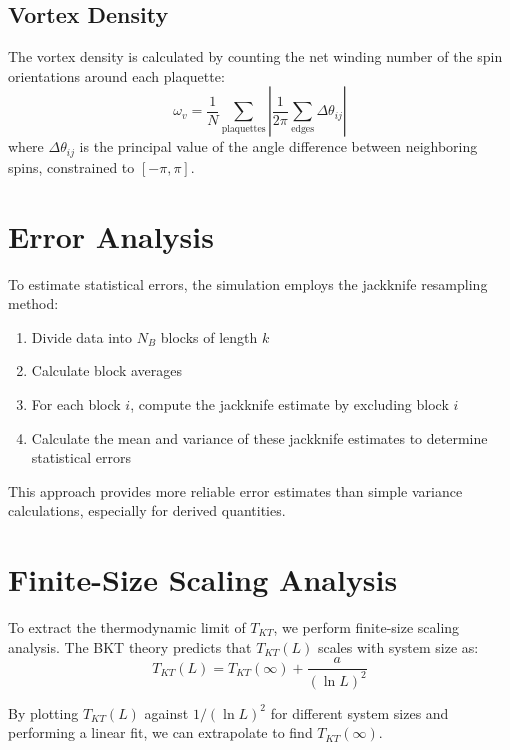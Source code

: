 \documentclass[12pt,a4paper]{article}
\begin{document}
\subsection{Vortex Density}

The vortex density is calculated by counting the net winding number of the spin orientations around each plaquette:
\begin{equation}
\omega_v = \frac{1}{N} \sum_{\text{plaquettes}} \left| \frac{1}{2\pi} \sum_{\text{edges}} \Delta\theta_{ij} \right|
\end{equation}
where $\Delta\theta_{ij}$ is the principal value of the angle difference between neighboring spins, constrained to $[-\pi, \pi]$.

\section{Error Analysis}

To estimate statistical errors, the simulation employs the jackknife resampling method:
\begin{enumerate}
    \item Divide data into $N_B$ blocks of length $k$
    \item Calculate block averages
    \item For each block $i$, compute the jackknife estimate by excluding block $i$
    \item Calculate the mean and variance of these jackknife estimates to determine statistical errors
\end{enumerate}

This approach provides more reliable error estimates than simple variance calculations, especially for derived quantities.

\section{Finite-Size Scaling Analysis}

To extract the thermodynamic limit of $T_{KT}$, we perform finite-size scaling analysis. The BKT theory predicts that $T_{KT}(L)$ scales with system size as:
\begin{equation}
T_{KT}(L) = T_{KT}(\infty) + \frac{a}{(\ln L)^2}
\end{equation}

By plotting $T_{KT}(L)$ against $1/(\ln L)^2$ for different system sizes and performing a linear fit, we can extrapolate to find $T_{KT}(\infty)$.
\end{document}
